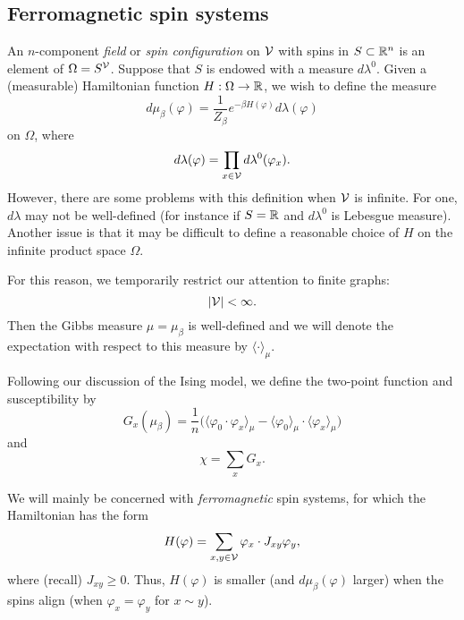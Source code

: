 
\subsection{Ferromagnetic spin systems}

An $n$-component \emph{field} or \emph{spin configuration} on $\mathcal{V}$
with spins in $S \subset {\mathbb R}^n$ is an element of $\Omega = S^{\mathcal{V}}$.
Suppose that $S$ is endowed with a measure $d\lambda^0$.
Given a (measurable) Hamiltonian function $H : \Omega \rightarrow {\mathbb R}$, we wish to define the measure
\begin{equation}
d\mu_\beta(\varphi)
  =
\frac{1}{Z_\beta} e^{-\beta H(\varphi)} d\lambda(\varphi)
\end{equation}
on $\Omega$, where
\begin{equation}
d\lambda(\varphi) = \prod_{x\in\mathcal{V}} d\lambda^0(\varphi_x).
\end{equation}
However, there are some problems with this definition when $\mathcal{V}$ is infinite.
For one, $d\lambda$ may not be well-defined (for instance if
$S = {\mathbb R}$ and $d\lambda^0$ is Lebesgue measure). Another issue is that it may be
difficult to define a reasonable choice of $H$ on the infinite product space
$\Omega$.

For this reason, we temporarily restrict our attention to finite graphs:
\begin{equation}
|\mathcal{V}| < \infty.
\end{equation}
Then the Gibbs measure $\mu = \mu_\beta$ is well-defined and we will denote the
expectation with respect to this measure by $\langle \cdot \rangle_\mu$.

Following our discussion of the Ising model, we define the two-point function
and susceptibility by
\begin{equation}
G_x(\mu_\beta)
  =
\frac{1}{n}
\big(\langle \varphi_0 \cdot \varphi_x \rangle_\mu
  -
\langle \varphi_0 \rangle_\mu \cdot \langle \varphi_x \rangle_\mu\big)
\end{equation}
and
\begin{equation}
\chi = \sum_x G_x.
\end{equation}

We will mainly be concerned with \emph{ferromagnetic} spin systems, for which the Hamiltonian has the form
\begin{equation}
H(\varphi) = \sum_{x, y \in \mathcal{V}} \varphi_x \cdot J_{xy} \varphi_y,
\end{equation}
where (recall) $J_{xy} \ge 0$. Thus, $H(\varphi)$ is smaller (and $d\mu_\beta(\varphi)$ larger) when the spins align (when $\varphi_x = \varphi_y$ for $x \sim y$).

